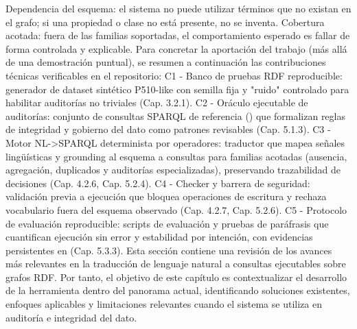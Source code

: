 \markdownRendererUlItem Dependencia del esquema: el sistema no puede utilizar términos que no existan en el grafo; si una propiedad o clase no está presente, no se inventa.\markdownRendererUlItemEnd 
\markdownRendererUlItem Cobertura acotada: fuera de las familias soportadas, el comportamiento esperado es fallar de forma controlada y explicable.\markdownRendererUlItemEnd 
\markdownRendererUlEndTight \markdownRendererInterblockSeparator
{}\markdownRendererInterblockSeparator
{}Para concretar la aportación del trabajo (más allá de una demostración puntual), se resumen a continuación las contribuciones técnicas verificables en el repositorio:\markdownRendererInterblockSeparator
{}\markdownRendererUlBeginTight
\markdownRendererUlItem C1 - Banco de pruebas RDF reproducible: generador de dataset sintético P510-like con semilla fija y "ruido" controlado para habilitar auditorías no triviales (Cap. 3.2.1).\markdownRendererUlItemEnd 
\markdownRendererUlItem C2 - Oráculo ejecutable de auditorías: conjunto de consultas SPARQL de referencia () que formalizan reglas de integridad y gobierno del dato como patrones revisables (Cap. 5.1.3).\markdownRendererUlItemEnd 
\markdownRendererUlItem C3 - Motor NL->SPARQL determinista por operadores: traductor que mapea señales lingüísticas y grounding al esquema a consultas  para familias acotadas (ausencia, agregación, duplicados y auditorías especializadas), preservando trazabilidad de decisiones (Cap. 4.2.6, Cap. 5.2.4).\markdownRendererUlItemEnd 
\markdownRendererUlItem C4 - Checker y barrera de seguridad: validación previa a ejecución que bloquea operaciones de escritura y rechaza vocabulario fuera del esquema observado (Cap. 4.2.7, Cap. 5.2.6).\markdownRendererUlItemEnd 
\markdownRendererUlItem C5 - Protocolo de evaluación reproducible: scripts de evaluación y pruebas de paráfrasis que cuantifican ejecución sin error y estabilidad por intención, con evidencias persistentes en  (Cap. 5.3.3).\markdownRendererUlItemEnd 
\markdownRendererUlEndTight \markdownRendererInterblockSeparator
{}\markdownRendererHorizontalRule{}\markdownRendererInterblockSeparator
{}\markdownRendererInterblockSeparator
{}Esta sección contiene una revisión de los avances más relevantes en la traducción de lenguaje natural a consultas ejecutables sobre grafos RDF. Por tanto, el objetivo de este capítulo es contextualizar el desarrollo de la herramienta dentro del panorama actual, identificando soluciones existentes, enfoques aplicables y limitaciones relevantes cuando el sistema se utiliza en auditoría e integridad del dato.\markdownRendererInterblockSeparator
